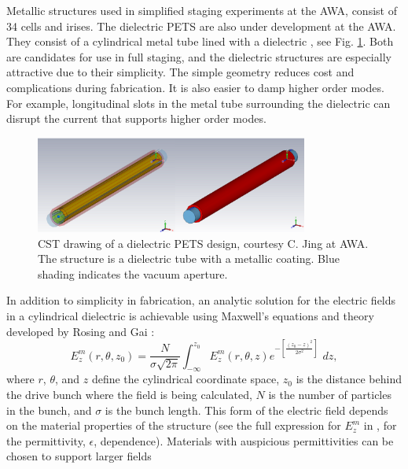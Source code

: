 Metallic structures used in simplified staging experiments at the AWA, consist of 34 cells and irises. 
The dielectric PETS are also under development at the AWA. 
They consist of a cylindrical metal tube lined with a dielectric \cite{PETSeq}, 
see Fig. \ref{fig:PETS}. Both are candidates for use in full staging, and 
the dielectric structures are especially attractive due to their simplicity. 
The simple geometry reduces cost and complications during fabrication.
It is also easier to damp higher order modes. For example, longitudinal slots in the metal tube surrounding
the dielectric can disrupt the current that supports higher order modes.   
\begin{figure}
	\begin{center}
		\includegraphics[width=0.8\textwidth]{images/pets-cst.png}
		\caption{CST drawing of a dielectric PETS design, courtesy C. Jing at AWA. 
		The structure is a dielectric tube with a metallic coating. Blue shading 
	indicates the vacuum aperture.}
		\label{fig:PETS}
	\end{center}
\end{figure}
In addition to simplicity in fabrication, an analytic solution for the electric fields
in a cylindrical dielectric is achievable using Maxwell's equations and theory developed
by Rosing and Gai \cite{RosingWei}: 
\begin{equation}
E^m_z\left(r,\theta,z_0\right)= \frac{N}{\sigma \sqrt{2\pi}}\int_{-\infty}^{z_0}E^m_z\left(r,\theta,z\right)e^{-\left[\frac{\left(z_0-z\right)^2}{2\sigma^2}\right]}\,\,dz , 
\end{equation}
where $r$, $\theta$, and $z$ define the cylindrical coordinate space, 
$z_0$ is the distance behind the drive bunch where the field is being calculated, 
$N$ is the number of particles in the bunch, and $\sigma$ is the bunch length.
This form of the electric field depends on the material properties of the structure
(see the full expression for $E_z^m$ in \cite{RosingWei}, for the permittivity, $\epsilon$, dependence).
Materials with auspicious permittivities can be chosen to support larger fields
